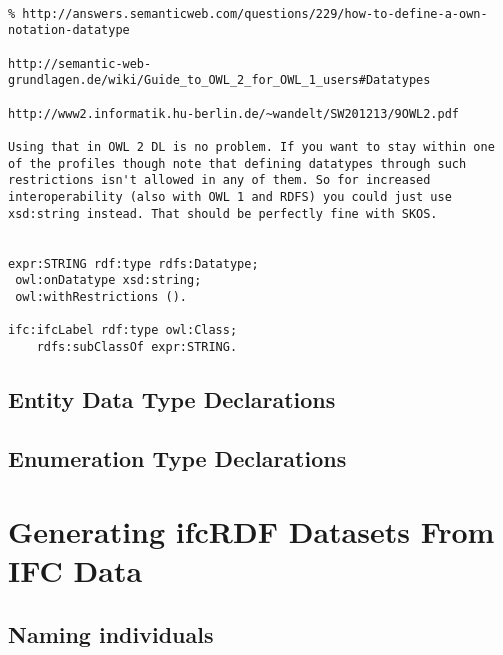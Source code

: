 \begin{lstlisting}[caption={},label=1]

% http://answers.semanticweb.com/questions/229/how-to-define-a-own-notation-datatype

http://semantic-web-grundlagen.de/wiki/Guide_to_OWL_2_for_OWL_1_users#Datatypes

http://www2.informatik.hu-berlin.de/~wandelt/SW201213/9OWL2.pdf

Using that in OWL 2 DL is no problem. If you want to stay within one of the profiles though note that defining datatypes through such restrictions isn't allowed in any of them. So for increased interoperability (also with OWL 1 and RDFS) you could just use xsd:string instead. That should be perfectly fine with SKOS.


expr:STRING rdf:type rdfs:Datatype;
 owl:onDatatype xsd:string;
 owl:withRestrictions ().
 
ifc:ifcLabel rdf:type owl:Class;
    rdfs:subClassOf expr:STRING.
\end{lstlisting}

\subsection{Entity Data Type Declarations}

\subsection{Enumeration Type Declarations}
\label{ifcOWL:enum-types}



\section{Generating ifcRDF Datasets From IFC Data}


\subsection{Naming individuals}
\label{ifcRDF:naming-individuals}